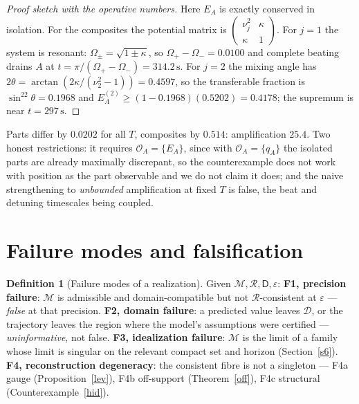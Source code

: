 \documentclass[12pt,a4paper]{article}
\theoremstyle{definition}
\newtheorem{definition}{Definition}[section]
\theoremstyle{plain}
\theoremstyle{commentary}
\newcommand{\Oc}{\mathcal{O}}
\newcommand{\Mc}{\mathcal{M}}
\newcommand{\Dsf}{\mathsf{D}}
\newcommand{\eps}{\varepsilon}
\newcommand{\Rc}{\mathcal{R}}
\begin{document}
\begin{proof}[Proof sketch with the operative numbers]
Here $E_A$ is exactly conserved in isolation. For the composites the potential matrix is $\left(\begin{smallmatrix}\nu_j^2&\kappa\\ \kappa&1\end{smallmatrix}\right)$. For $j=1$ the system is resonant: $\Omega_\pm=\sqrt{1\pm\kappa}$, so $\Omega_+-\Omega_-=0.0100$ and complete beating drains $A$ at $t=\pi/(\Omega_+-\Omega_-)=314.2\,\mathrm{s}$. For $j=2$ the mixing angle has $2\theta=\arctan(2\kappa/(\nu_2^2-1))=0.4597$, so the transferable fraction is $\sin^22\theta=0.1968$ and $E_A^{(2)}\ge(1-0.1968)(0.5202)=0.4178$; the supremum is near $t=297\,\mathrm{s}$.
\end{proof}

Parts differ by $0.0202$ for all $T$, composites by $0.514$: amplification $25.4$. Two honest restrictions: it requires $\Oc_A=\{E_A\}$, since with $\Oc_A=\{q_A\}$ the isolated parts are already maximally discrepant, so the counterexample does not work with position as the part observable and we do not claim it does; and the naive strengthening to \emph{unbounded} amplification at fixed $T$ is false, the beat and detuning timescales being coupled.

\section{Failure modes and falsification}
\label{s8}

\begin{definition}[Failure modes of a realization]
\label{fail}
Given $\Mc,\Rc,\Dsf,\eps$:
\textbf{F1, precision failure}: $\Mc$ is admissible and domain-compatible but not $\Rc$-consistent at $\eps$ --- \emph{false} at that precision.
\textbf{F2, domain failure}: a predicted value leaves $\mathcal{D}$, or the trajectory leaves the region where the model's assumptions were certified --- \emph{uninformative}, not false.
\textbf{F3, idealization failure}: $\Mc$ is the limit of a family whose limit is singular on the relevant compact set and horizon (Section~\ref{s6}).
\textbf{F4, reconstruction degeneracy}: the consistent fibre is not a singleton --- F4a gauge (Proposition~\ref{lev}), F4b off-support (Theorem~\ref{off}), F4c structural (Counterexample~\ref{hid}).
\end{definition}
\end{document}

